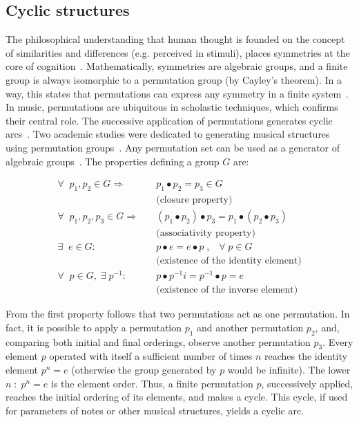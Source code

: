 \subsection{Cyclic structures}\label{estCic}
The philosophical understanding that human thought is founded on the concept of similarities and differences (e.g. perceived in stimuli), places symmetries
at the core of cognition~\cite{Deleuze}. Mathematically, symmetries are algebraic groups, and a finite group is always isomorphic to a permutation
group (by Cayley's theorem).
In a way, this states that permutations can express any symmetry in a
finite system~\cite{gruposFascination}.
In music, permutations are ubiquitous in scholastic techniques,
 which confirms their central role.
The successive application of permutations generates cyclic arcs~\cite{change,Zamacois,permMusic}. Two academic studies were dedicated to generating musical structures using permutation groups~\cite{figgusOriginal, figgusEspacializacao}. Any permutation set can be used as a generator of algebraic groups~\cite{permMusic}.
The properties defining a group $G$ are:

\begin{equation}\label{eq:groups}
\begin{split}
\forall \;\; p_1,p_2 \in G \Rightarrow  \quad   & p_1 \bullet p_2  = p_3 \in G \\ 
     & \text{(closure property)} \\
\forall \;\; p_1,p_2,p_3 \in G \Rightarrow \quad & (p_1\bullet p_2)\bullet p_3  = p_1\bullet (p_2\bullet p_3) \\
     & \text{(associativity property)} \\
\exists \;\; e \in G :                  \quad    & p \bullet e  = e \bullet p \;,\;\;\; \forall\; p \in G  \\ 
     &  \text{(existence of the identity element)} \\
\forall \;\; p \in G, \;\exists\; p^{-1} :\quad  &  p\bullet p^{-1}i =p^{-1}\bullet p = e \\
     &  \text{(existence of the inverse element)}
\end{split}
\end{equation}

From the first property follows that two permutations act as one permutation. In fact, it is possible to apply a
permutation $p_1$ and another permutation $p_2$, and, comparing both initial and final orderings, observe another permutation $p_3$. Every element $p$ operated with itself a sufficient number of times $n$ reaches the identity element $p^n=e$ (otherwise the group generated by $p$ would be infinite). The lower $n\;:\;p^n=e$ is the element order. Thus, a finite
permutation $p$, successively applied, reaches the initial ordering of its
elements, and makes a cycle. This cycle, if used for parameters of notes or other musical structures,
yields a cyclic arc.

